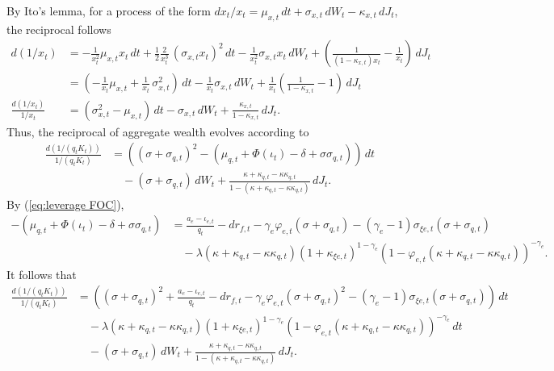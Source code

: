 \documentclass[12 pt, oneside]{article}
\theoremstyle{definition}
\theoremstyle{definition}
\theoremstyle{definition}
\begin{document}
By Ito's lemma, for a process of the form $dx_t/x_t = \mu_{x, t}\, dt + \sigma_{x, t}\, dW_t - \kappa_{x, t}\, dJ_t$, the reciprocal follows
\begin{align*}
  d(1 / x_t) & = -\frac{1}{x_t^2}\mu_{x, t}x_t\, dt + \frac{1}{2} \frac{2}{x_t^3}\, (\sigma_{x, t}x_t)^2\, dt - \frac{1}{x_t^2}\sigma_{x, t}x_t\, dW_t +\left(\frac{1}{(1 - \kappa_{x, t})x_t} - \frac{1}{x_t}\right)\, dJ_t\\
             & = \left(-\frac{1}{x_t}\mu_{x, t} +  \frac{1}{x_t}\, \sigma_{x, t}^2\right) \, dt - \frac{1}{x_t}\sigma_{x, t}\, dW_t +\frac{1}{x_t}\left(\frac{1}{1 - \kappa_{x, t}} - 1\right)\, dJ_t\\
\frac{d(1 / x_t)}{1 / x_t} & = \left(\sigma_{x, t}^2-\mu_{x, t} \right) \, dt - \sigma_{x, t}\, dW_t + \frac{\kappa_{x, t}}{1 - \kappa_{x, t}}\, dJ_t.
\end{align*}
Thus, the reciprocal of aggregate wealth evolves according to
\begin{align*}
\frac{d(1/(q_tK_t))}{1  / (q_tK_t)} & = ((\sigma + \sigma_{q, t})^2 - (\mu_{q, t} + \Phi(\iota_t) - \delta + \sigma\sigma_{q, t}))\, dt\\
                                    &\quad - (\sigma + \sigma_{q, t})\, dW_t + \frac{\kappa + \kappa_{q, t} - \kappa\kappa_{q, t}}{1 - (\kappa + \kappa_{q, t} - \kappa\kappa_{q, t})}\, dJ_t.
\end{align*}
By (\ref{eq:leverage FOC}),
\begin{align*}
  -(\mu_{q, t} + \Phi(\iota_t) - \delta + \sigma\sigma_{q, t}) & = \frac{a_e - \iota_{e, t}}{q_t} - dr_{f, t}  -\gamma_e\varphi_{e, t}(\sigma + \sigma_{q, t}) - (\gamma_e - 1)\sigma_{\xi e, t}(\sigma + \sigma_{q, t})\\
                                                               &\quad - \lambda(\kappa + \kappa_{q, t} - \kappa\kappa_{q, t})(1 + \kappa_{\xi e, t})^{1 - \gamma_e}(1 - \varphi_{e, t}(\kappa + \kappa_{q, t} - \kappa\kappa_{q, t}))^{ - \gamma_e}.
\end{align*}
It follows that
\begin{align*}
\frac{d(1/(q_tK_t))}{1  / (q_tK_t)} & = \left((\sigma + \sigma_{q, t})^2 + \frac{a_e - \iota_{e, t}}{q_t} - dr_{f, t}  -\gamma_e\varphi_{e, t}(\sigma + \sigma_{q, t})^2 - (\gamma_e - 1)\sigma_{\xi e, t}(\sigma + \sigma_{q, t})\right)\, dt\\
                                    &\quad  - \lambda(\kappa + \kappa_{q, t} - \kappa\kappa_{q, t})(1 + \kappa_{\xi e, t})^{1 - \gamma_e}(1 - \varphi_{e, t}(\kappa + \kappa_{q, t} - \kappa\kappa_{q, t}))^{ - \gamma_e}\, dt\\
                                    &\quad- (\sigma + \sigma_{q, t})\, dW_t + \frac{\kappa + \kappa_{q, t} - \kappa\kappa_{q, t}}{1 - (\kappa + \kappa_{q, t} - \kappa\kappa_{q, t})}\, dJ_t.
\end{align*}
\end{document}
